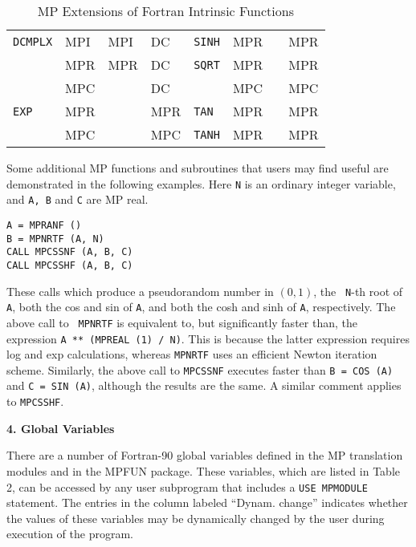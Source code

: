 \begin{table}
\begin{center}
\begin{tabular}{|l|l|l|l|l|l|l|l|}
{\tt DCMPLX}& MPI  & MPI  & DC    & {\tt SINH} & MPR  &      & MPR \\
            & MPR  & MPR  & DC    & {\tt SQRT} & MPR  &      & MPR \\
            & MPC  &      & DC    &            & MPC  &      & MPC \\
{\tt EXP}   & MPR  &      & MPR   & {\tt TAN}  & MPR  &      & MPR \\
            & MPC  &      & MPC   & {\tt TANH} & MPR  &      & MPR \\
\hline
\end{tabular}
\caption{MP Extensions of Fortran Intrinsic Functions}
\end{center} \end{table}

Some additional MP functions and subroutines that users may find
useful are demonstrated in the following examples.  Here {\tt N} is an
ordinary integer variable, and {\tt A, B} and {\tt C} are MP real.

\begin{tt} \begin{small} \begin{verbatim}
A = MPRANF () 
B = MPNRTF (A, N) 
CALL MPCSSNF (A, B, C) 
CALL MPCSSHF (A, B, C)
\end{verbatim} \end{small} \end{tt}

\noindent
These calls which produce a pseudorandom number in $(0,1)$, the {\tt
N}-th root of {\tt A}, both the cos and sin of {\tt A}, and both the
cosh and sinh of {\tt A}, respectively.  The above call to {\tt
MPNRTF} is equivalent to, but significantly faster than, the
expression {\tt A ** (MPREAL (1) / N)}.  This is because the latter
expression requires log and exp calculations, whereas {\tt MPNRTF}
uses an efficient Newton iteration scheme.  Similarly, the above call
to {\tt MPCSSNF} executes faster than {\tt B = COS (A)} and {\tt C =
SIN (A)}, although the results are the same.  A similar comment
applies to {\tt MPCSSHF}.

\vspace{2ex} \noindent
{\bf 4. Global Variables}

There are a number of Fortran-90 global variables defined in the MP
translation modules and in the MPFUN package.  These variables, which
are listed in Table 2, can be accessed by any user subprogram that
includes a {\tt USE MPMODULE} statement.  The entries in the column
labeled ``Dynam. change'' indicates whether the values of these
variables may be dynamically changed by the user during execution of
the program.

